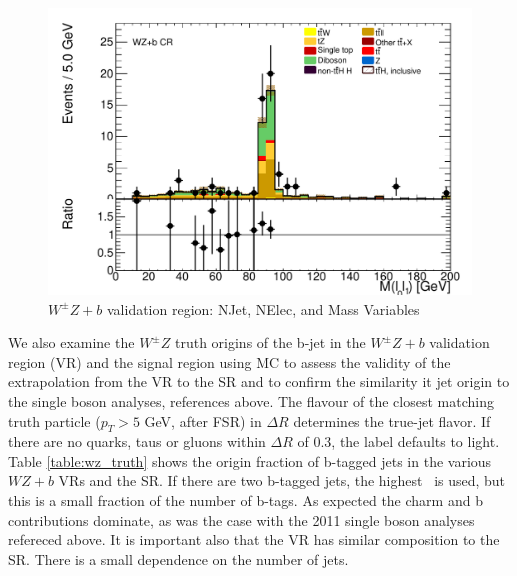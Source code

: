 \begin{figure}[!htbp]
\begin{minipage}[h]{0.5\textwidth}
  \end{minipage}\hfill
  \begin{minipage}[h]{0.5\textwidth}
    \centering \includegraphics[width=\textwidth]{figs/WZ/standardCR_3l_WZ_MT_1b_Mll01_thesis}
  \end{minipage}\hfill
\caption{$W^{\pm}Z+b$ validation region: NJet, NElec, and Mass Variables} 
\label{figure:background_wz_z_b}
\end{figure} 

We also examine the $W^{\pm}Z$ truth origins of the b-jet in the $W^{\pm}Z+b$ validation region (VR) and the signal region using MC to assess the validity of the extrapolation from the VR to the SR and to confirm the similarity it jet origin to the single boson analyses, references above. The flavour of the closest matching truth particle ($p_T > 5$ GeV, after FSR) in $\Delta R$ determines the true-jet flavor. If there are no quarks, taus or gluons within $\Delta R$ of 0.3, the label defaults to light.  Table \ref{table:wz_truth} shows the origin fraction of b-tagged jets in the various $WZ+b$ VRs and the SR. If there are two b-tagged jets, the highest \pt\ is used, but this is a small fraction of the number of b-tags. As expected the charm and b contributions dominate, as was the case with the 2011 single boson analyses refereced above. It is important also that the VR has similar composition to the SR.  There is a small dependence on the number of jets. 

